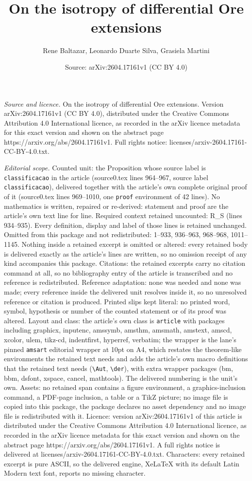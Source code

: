 \documentclass[10pt,a4paper]{amsart}
\title[On the isotropy of differential Ore extensions]{On the isotropy of differential Ore extensions}
\author{Rene Baltazar, Leonardo Duarte Silva, Grasiela Martini}
\date{Source: arXiv:2604.17161v1 (CC BY 4.0)}
\begin{document}
\maketitle

\noindent\emph{Source and licence.} On the isotropy of differential Ore extensions. Version arXiv:2604.17161v1 (CC BY 4.0), distributed under the Creative Commons Attribution 4.0 International licence, as recorded in the arXiv licence metadata for this exact version and shown on the abstract page https://arxiv.org/abs/2604.17161v1. Full rights notice: licenses/arxiv-2604.17161-CC-BY-4.0.txt.\par\smallskip

\noindent\textit{Editorial scope.} Counted unit: the Proposition whose source label is \texttt{classificacao} in the article (source0.tex lines 964--967, source label \texttt{classificacao}), delivered together with the article's own complete original proof of it (source0.tex lines 969--1010, one \texttt{proof} environment of 42 lines). No mathematics is written, repaired or re-derived: statement and proof are the article's own text line for line. Required context retained uncounted: R\_S (lines 934--935). Every definition, display and label of those lines is retained unchanged. Omitted from this package and not redistributed: 1--933, 936--963, 968--968, 1011--1145. Nothing inside a retained excerpt is omitted or altered: every retained body is delivered exactly as the article's lines are written, so no omission receipt of any kind accompanies this package. Citations: the retained excerpts carry no citation command at all, so no bibliography entry of the article is transcribed and no reference is redistributed. Reference adaptation: none was needed and none was made; every reference inside the delivered unit resolves inside it, so no unresolved reference or citation is produced. Printed slips kept literal: no printed word, symbol, hypothesis or number of the counted statement or of its proof was altered. Layout and class: the article's own class is \texttt{article} with packages including graphicx, inputenc, amssymb, amsthm, amsmath, amstext, amscd, xcolor, ulem, tikz-cd, indentfirst, hyperref, verbatim; the wrapper is the lane's pinned \texttt{amsart} editorial wrapper at 10pt on A4, which restates the theorem-like environments the retained text needs and adds the article's own macro definitions that the retained text needs (\texttt{\textbackslash Aut}, \texttt{\textbackslash der}), with extra wrapper packages (bm, bbm, dsfont, xspace, cancel, mathtools). The delivered numbering is the unit's own. Assets: no retained span contains a figure environment, a graphics-inclusion command, a PDF-page inclusion, a table or a TikZ picture; no image file is copied into this package, the package declares no asset dependency and no image file is redistributed with it. Licence: version arXiv:2604.17161v1 of this article is distributed under the Creative Commons Attribution 4.0 International licence, as recorded in the arXiv licence metadata for this exact version and shown on the abstract page https://arxiv.org/abs/2604.17161v1. A full rights notice is delivered at licenses/arxiv-2604.17161-CC-BY-4.0.txt. Characters: every retained excerpt is pure ASCII, so the delivered engine, XeLaTeX with its default Latin Modern text font, reports no missing character.
\end{document}

